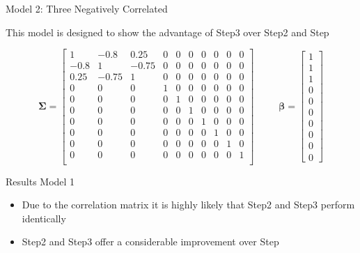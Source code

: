 \documentclass[ignorenonframetext,]{beamer}
\providecommand{\tightlist}{%
  \setlength{\itemsep}{0pt}\setlength{\parskip}{0pt}}
\begin{document}
\begin{frame}{Model 2: Three Negatively Correlated}

This model is designed to show the advantage of Step3 over Step2 and
Step

\[\boldsymbol{\Sigma} = \begin{bmatrix}
1     & -0.8  & 0.25  & 0 & 0 & 0 & 0 & 0 & 0 & 0 \\
-0.8  & 1     & -0.75 & 0 & 0& 0 & 0 & 0 & 0 & 0 \\
0.25  & -0.75 & 1     & 0 & 0& 0 & 0 & 0 & 0 & 0 \\
0     & 0     & 0     & 1 & 0& 0 & 0 & 0 & 0 & 0 \\
0     & 0     & 0     & 0 & 1 & 0 & 0 & 0 & 0 & 0 \\
0     & 0     & 0     & 0 & 0 & 1 & 0 & 0 & 0 & 0 \\
0     & 0     & 0     & 0 & 0 & 0 & 1 & 0 & 0 & 0 \\
0     & 0     & 0     & 0 & 0 & 0 & 0 & 1 & 0 & 0 \\
0     & 0     & 0     & 0 & 0 & 0 & 0 & 0 & 1 & 0 \\
0     & 0     & 0     & 0 & 0 & 0 & 0 & 0 & 0 & 1 \\
\end{bmatrix}
\hspace{10pt}
\hspace{20pt}
\boldsymbol{\beta}  =
\begin{bmatrix} 1 \\ 1 \\ 1 \\ 0 \\ 0 \\ 0 \\ 0 \\ 0 \\ 0 \\ 0
\end{bmatrix}\]

\end{frame}

\begin{frame}{Results Model 1}

\begin{itemize}
\tightlist
\item
  Due to the correlation matrix it is highly likely that Step2 and Step3
  perform identically
\item
  Step2 and Step3 offer a considerable improvement over Step
\end{itemize}

\end{frame}
\end{document}
